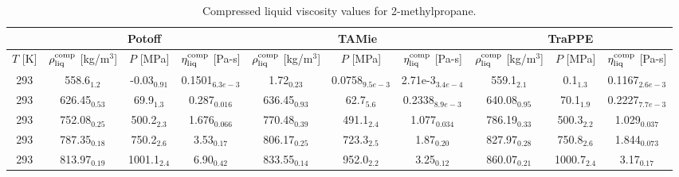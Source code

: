 \documentclass[preprint,review,12pt]{elsarticle}
\begin{document}
	\begin{table}[H]
		\caption{Compressed liquid viscosity values for 2-methylpropane.}
		\begin{center}
			\begin{tabular}{|c|c|c|c|c|c|c|c|c|c|}
				\hline
				& \multicolumn{3}{c|}{Potoff}                                                                          & \multicolumn{3}{c|}{TAMie}                                                                              & \multicolumn{3}{c|}{TraPPE}                                                                          \\ \hline
				$T$ {[}K{]} & $\rho^{\rm comp}_{\rm liq}$ {[}kg/m$^3${]} & $P$ {[}MPa{]}  & $\eta^{\rm comp}_{\rm liq}$ {[}Pa-s{]} & $\rho^{\rm comp}_{\rm liq}$ {[}kg/m$^3${]} & $P$ {[}MPa{]}     & $\eta^{\rm comp}_{\rm liq}$ {[}Pa-s{]} & $\rho^{\rm comp}_{\rm liq}$ {[}kg/m$^3${]} & $P$ {[}MPa{]}  & $\eta^{\rm comp}_{\rm liq}$ {[}Pa-s{]} \\ \hline
				293         & 558.6$_{1.2}$                              & -0.03$_{0.91}$ & 0.1501$_{6.3e-3}$                      & 1.72$_{0.23}$                          & 0.0758$_{9.5e-3}$ & 2.71e-3$_{3.4e-4}$                     & 559.1$_{2.1}$                          & 0.1$_{1.3}$    & 0.1167$_{2.6e-3}$                      \\ \hline
				293         & 626.45$_{0.53}$                            & 69.9$_{1.3}$   & 0.287$_{0.016}$                        & 636.45$_{0.93}$                         & 62.7$_{5.6}$      & 0.2338$_{8.9e-3}$                      & 640.08$_{0.95}$                         & 70.1$_{1.9}$   & 0.2227$_{7.7e-3}$                      \\ \hline
				293         & 752.08$_{0.25}$                            & 500.2$_{2.3}$  & 1.676$_{0.066}$                        & 770.48$_{0.39}$                         & 491.1$_{2.4}$     & 1.077$_{0.034}$                        & 786.19$_{0.33}$                         & 500.3$_{2.2}$  & 1.029$_{0.037}$                        \\ \hline
				293         & 787.35$_{0.18}$                            & 750.2$_{2.6}$  & 3.53$_{0.17}$                          & 806.17$_{0.25}$                         & 723.3$_{2.5}$     & 1.87$_{0.20}$                          & 827.97$_{0.28}$                         & 750.8$_{2.6}$  & 1.844$_{0.073}$                        \\ \hline
				293         & 813.97$_{0.19}$                            & 1001.1$_{2.4}$ & 6.90$_{0.42}$                          & 833.55$_{0.14}$                         & 952.0$_{2.2}$     & 3.25$_{0.12}$                          & 860.07$_{0.21}$                         & 1000.7$_{2.4}$ & 3.17$_{0.17}$                          \\ \hline
			\end{tabular}
		\end{center}
	\end{table}
\end{document}
